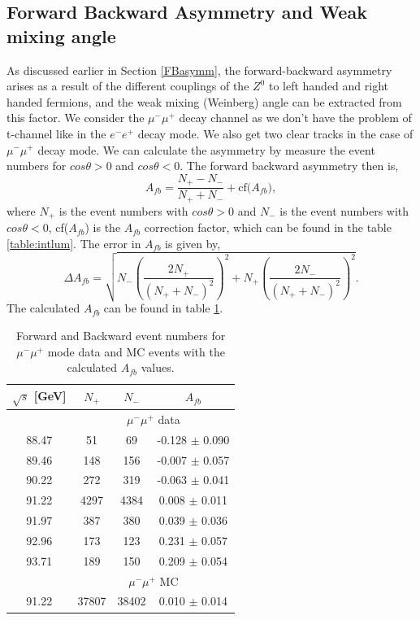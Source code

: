 \subsection{Forward Backward Asymmetry and Weak mixing angle}
As discussed earlier in Section \ref{FBasymm}, the forward-backward asymmetry arises as a result of the different couplings of the $Z^{0}$ to left handed and right handed fermions, and the weak mixing (Weinberg) angle can be extracted from this factor. We consider the $\mu^-\mu^+$ decay channel as we don't have the problem of t-channel like in the $e^-e^+$ decay mode. We also get two clear tracks in the case of $\mu^-\mu^+$ decay mode. We can calculate the asymmetry by measure the event numbers for $cos\theta > 0$ and $cos\theta < 0$. The forward backward asymmetry then is,
\begin{equation}
    A_{fb} = \frac{N_+ - N_-}{N_+ + N_-} + \text{cf($A_{fb}$)},
\end{equation}
where $N_+$ is the event numbers with $cos\theta > 0$ and $N_-$ is the event numbers with $cos\theta < 0$, cf($A_{fb}$) is the $A_{fb}$ correction factor, which can be found in the table \ref{table:intlum}. The error in $A_{fb}$ is given by,
\begin{equation}
    \Delta A_{fb} = \sqrt{N_-\left(\frac{2N_+}{(N_+ + N_-)^2}\right)^2 + 
    N_+\left(\frac{2N_-}{(N_+ + N_-)^2}\right)^2}.
\end{equation}
The calculated $A_{fb}$ can be found in table \ref{table:afb}.\\
\begin{table}[h!]
\centering
\begin{tabular}{c|ccc}
\hline
$\sqrt{s}$ {[}GeV{]} & $N_+$ & $N_-$ & $A_{fb}$           \\ \hline
                    & \multicolumn{3}{c}{$\mu^-\mu^+$ data}  \\ \hline
88.47                & 51    & 69    & -0.128 $\pm$ 0.090 \\
89.46                & 148   & 156   & -0.007 $\pm$ 0.057 \\
90.22                & 272   & 319   & -0.063 $\pm$ 0.041 \\
91.22                & 4297  & 4384  & 0.008 $\pm$ 0.011  \\
91.97                & 387   & 380   & 0.039 $\pm$ 0.036  \\
92.96                & 173   & 123   & 0.231 $\pm$ 0.057  \\
93.71                & 189   & 150   & 0.209 $\pm$ 0.054  \\ \hline
                     & \multicolumn{3}{c}{$\mu^-\mu^+$ MC}  \\ \hline
91.22                & 37807 & 38402 & 0.010 $\pm$ 0.014    \\ \hline
\end{tabular}
\caption{Forward and Backward event numbers for $\mu^-\mu^+$ mode data and MC events with the calculated $A_{fb}$ values.}
\label{table:afb}
\end{table}

